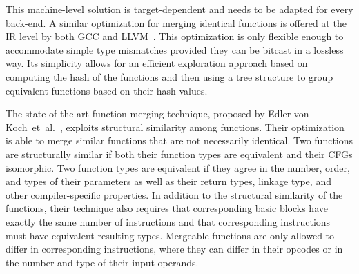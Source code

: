 This machine-level solution is target-dependent and needs to be adapted for every back-end.
A similar optimization for merging identical functions %
is offered at the IR level by both GCC and LLVM~\cite{llvm-fm,livska14}.
This optimization is only flexible enough to accommodate simple type mismatches
provided they can be bitcast in a lossless way.
Its simplicity allows for an efficient exploration approach based on computing
the hash of the functions and then using a tree structure to group equivalent
functions based on their hash values.

The state-of-the-art function-merging technique, proposed by Edler von
Koch~et~al.~\cite{edler14}, exploits structural similarity among functions.
Their optimization is able to merge similar functions that are not necessarily
identical.
Two functions are structurally similar if both their function types are equivalent
and their CFGs isomorphic.
Two function types are equivalent if they agree in the number, order, and types
of their parameters as well as
their return types, linkage type, and other compiler-specific properties.
In addition to the structural similarity of the functions, their technique also
requires that corresponding basic blocks have exactly the same number of instructions
and that corresponding instructions must have equivalent resulting types.
Mergeable functions are only allowed to differ in corresponding instructions,
where they can differ in their opcodes or in the number and type of their input operands.

